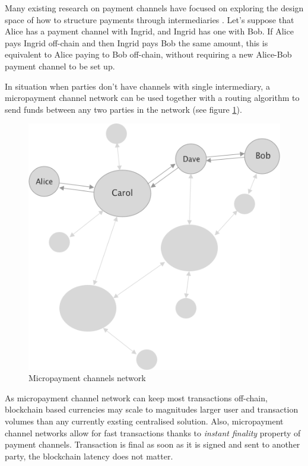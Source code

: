 \documentclass[a4paper,12pt]{article}
\begin{document}
Many existing research on payment channels have focused on exploring the design
space of how to structure payments through intermediaries \cite{counterfactual, 
perun, lightning}. Let's suppose that Alice has a payment channel with Ingrid, and 
Ingrid has one with Bob. If Alice pays Ingrid off-chain and then Ingrid pays Bob 
the same amount, this is equivalent to Alice paying to Bob off-chain, without 
requiring a new Alice-Bob payment channel to be set up.

In situation when parties don't have channels with single intermediary, a 
micropayment channel network can be used together with a routing algorithm to 
send funds between any two parties in the network (see figure \ref{img:lightning}).

\begin{figure}[H]
    \centering
    \includegraphics[scale=0.5]{../img/lightning-network}
    \caption{Micropayment channels network}
    \label{img:lightning}
\end{figure}

As micropayment channel network can keep most transactions off-chain, blockchain 
based currencies may scale to magnitudes larger user and transaction volumes than 
any currently exsting centralised solution. Also, micropayment channel networks 
allow for fast transactions thanks to \textit{instant finality} property of 
payment channels. Transaction is final as soon as it is signed and sent to 
another party, the blockchain latency does not matter. \\
\end{document}
